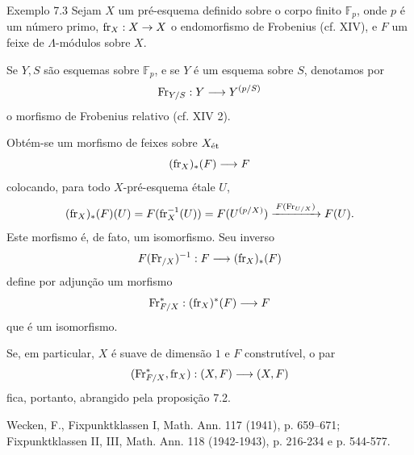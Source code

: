 \begin{statement}{Exemplo 7.3}
Sejam $X$ um pré-esquema definido sobre o corpo finito $\mathbb F_p$, onde $p$ é um número primo, $\operatorname{fr}_X:X\to X$ o endomorfismo de Frobenius (cf. XIV), e $F$ um feixe de $\Lambda$-módulos sobre $X$.

Se $Y,S$ são esquemas sobre $\mathbb F_p$, e se $Y$ é um esquema sobre $S$, denotamos por
\[
\operatorname{Fr}_{Y/S}:Y\longrightarrow Y^{(p/S)}
\]
o morfismo de Frobenius relativo (cf. XIV 2).

Obtém-se um morfismo de feixes sobre $X_{\mathrm{\acute{e}t}}$
\[
(\operatorname{fr}_X)_*(F)\longrightarrow F
\]
colocando, para todo $X$-pré-esquema étale $U$,
\[
(\operatorname{fr}_X)_*(F)(U)=F(\operatorname{fr}_X^{-1}(U))=F(U^{(p/X)})
 \xrightarrow{\,F(\operatorname{Fr}_{U/X})\,}F(U).
\]
Este morfismo é, de fato, um isomorfismo. Seu inverso
\[
F(\operatorname{Fr}_{/X})^{-1}:F\longrightarrow (\operatorname{fr}_X)_*(F)
\]
define por adjunção um morfismo
\[
\operatorname{Fr}_{F/X}^*:(\operatorname{fr}_X)^*(F)\longrightarrow F
\]
que é um isomorfismo.

Se, em particular, $X$ é suave de dimensão $1$ e $F$ construtível, o par
\[
(\operatorname{Fr}_{F/X}^*,\operatorname{fr}_X):(X,F)\longrightarrow (X,F)
\]
fica, portanto, abrangido pela proposição 7.2.
\end{statement}

\noindent[1] Wecken, F., Fixpunktklassen I, Math. Ann. 117 (1941), p. 659--671; Fixpunktklassen II, III, Math. Ann. 118 (1942-1943), p. 216-234 e p. 544-577.
